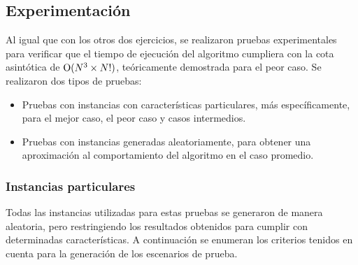     \subsection{Experimentación}

        Al igual que con los otros dos ejercicios, se realizaron pruebas experimentales para verificar que el tiempo de ejecución del algoritmo cumpliera con la cota asintótica de $\operatorname{O}(N^3 \times N!)$, teóricamente demostrada para el peor caso. Se realizaron dos tipos de pruebas:
        
        \begin{itemize}
            \item Pruebas con instancias con características particulares, más específicamente, para el mejor caso, el peor caso y casos intermedios.
            \item Pruebas con instancias generadas aleatoriamente, para obtener una aproximación al comportamiento del algoritmo en el caso promedio.
        \end{itemize}

        \subsubsection{Instancias particulares}

            Todas las instancias utilizadas para estas pruebas se generaron de manera aleatoria, pero restringiendo los resultados obtenidos para cumplir con determinadas características. A continuación se enumeran los criterios tenidos en cuenta para la generación de los escenarios de prueba.


